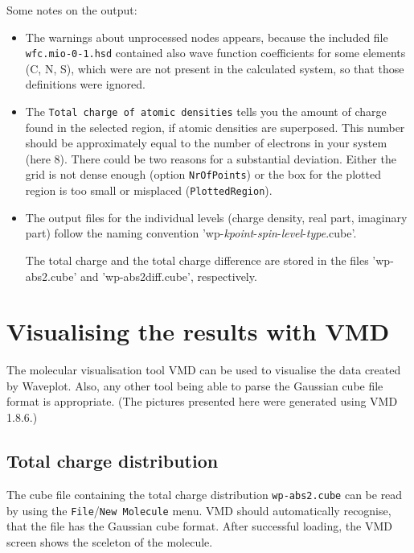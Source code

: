 Some notes on the output:
\begin{itemize}
\item The warnings about unprocessed nodes appears, because the
  included file \verb|wfc.mio-0-1.hsd| contained also wave function
  coefficients for some elements (C, N, S), which were are not present
  in the calculated system, so that those definitions were ignored.

\item The \verb|Total charge of atomic densities| tells you the amount
  of charge found in the selected region, if atomic densities are
  superposed. This number should be approximately equal to the number
  of electrons in your system (here 8).
  There could be two reasons for a substantial deviation. Either the
  grid is not dense enough (option \verb|NrOfPoints|) or the box for
  the plotted region is too small or misplaced (\verb|PlottedRegion|).

\item The output files for the individual levels (charge density, real part,
  imaginary part) follow the naming convention
  'wp-{\it kpoint}-{\it spin}-{\it level}-{\it type}.cube'. 

  The total charge and the total charge difference are stored in the
  files 'wp-abs2.cube' and 'wp-abs2diff.cube', respectively.
\end{itemize}


\section{Visualising the results with VMD}

The molecular visualisation tool VMD can be used to visualise the data created
by Waveplot. Also, any other tool being able to parse the Gaussian cube file
format is appropriate. (The pictures presented here were generated using VMD
1.8.6.)

\subsection{Total charge distribution}

The cube file containing the total charge distribution
\verb|wp-abs2.cube| can be read by using the
\verb|File|/\verb|New Molecule| menu. VMD should automatically
recognise, that the file has the Gaussian cube format. After
successful loading, the VMD screen shows the sceleton of the molecule.

